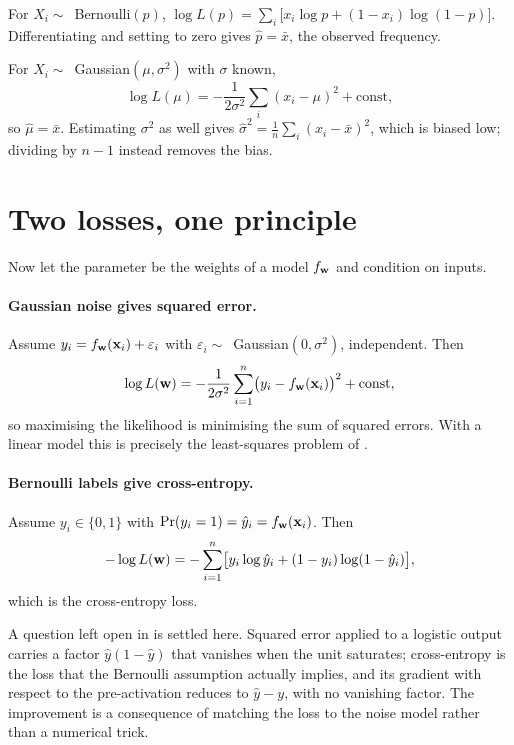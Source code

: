 \begin{example}
For \(X_i\sim\)~Bernoulli\((p)\),
\(\log L(p)=\sum_i\bigl[x_i\log p+(1-x_i)\log(1-p)\bigr]\). Differentiating and
setting to zero gives \(\hat p=\bar x\), the observed frequency.
\end{example}

\begin{example}
For \(X_i\sim\)~Gaussian\((\mu,\sigma^{2})\) with \(\sigma\) known,
\[
	\log L(\mu)=-\frac{1}{2\sigma^{2}}\sum_i(x_i-\mu)^{2}+\text{const},
\]
so \(\hat\mu=\bar x\). Estimating \(\sigma^{2}\) as well gives
\(\hat\sigma^{2}=\frac1n\sum_i(x_i-\bar x)^{2}\), which is biased low; dividing by
\(n-1\) instead removes the bias.
\end{example}

\section{Two losses, one principle}

Now let the parameter be the weights of a model \(f_{\mathbf{w}}\) and condition on
inputs.

\paragraph{Gaussian noise gives squared error.}
Assume \(y_i=f_{\mathbf{w}}(\mathbf{x}_i)+\varepsilon_i\) with
\(\varepsilon_i\sim\)~Gaussian\((0,\sigma^{2})\), independent. Then
\[
	\log L(\mathbf{w})
	=-\frac{1}{2\sigma^{2}}\sum_{i=1}^{n}\bigl(y_i-f_{\mathbf{w}}(\mathbf{x}_i)\bigr)^{2}
	+\text{const},
\]
so maximising the likelihood is minimising the sum of squared errors. With a
linear model this is precisely the least-squares problem of
.

\paragraph{Bernoulli labels give cross-entropy.}
Assume \(y_i\in\{0,1\}\) with
\(\operatorname{Pr}(y_i=1)=\hat y_i=f_{\mathbf{w}}(\mathbf{x}_i)\). Then
\[
	-\log L(\mathbf{w})
	=-\sum_{i=1}^{n}\bigl[y_i\log\hat y_i+(1-y_i)\log(1-\hat y_i)\bigr],
\]
which is the cross-entropy loss.

\begin{remark}
A question left open in  is settled here. Squared
error applied to a logistic output carries a factor \(\hat y(1-\hat y)\) that vanishes when the unit
saturates; cross-entropy is the loss that the Bernoulli assumption actually
implies, and its gradient with respect to the pre-activation reduces to
\(\hat y-y\), with no vanishing factor. The improvement is a consequence of
matching the loss to the noise model rather than a numerical trick.
\end{remark}


